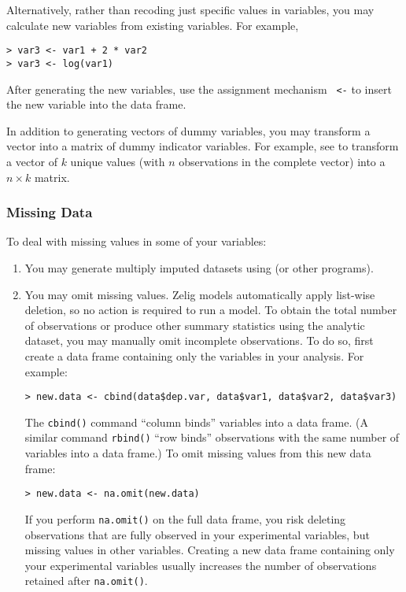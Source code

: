 \documentclass{article}
\begin{document}
Alternatively, rather than recoding just specific values in variables,
you may calculate new variables from existing variables.  For example,
\begin{verbatim}
> var3 <- var1 + 2 * var2   
> var3 <- log(var1)         
\end{verbatim}
After generating the new variables, use the assignment mechanism {\tt
  <-} to insert the new variable into the data frame.

In addition to generating vectors of dummy variables, you may
transform a vector into a matrix of dummy indicator variables.  For
example, see  to transform a vector of $k$ unique values
(with $n$ observations in the complete vector) into a $n \times k$
matrix.

\subsubsection*{Missing Data} 

To deal with missing values in some of your variables:
\begin{enumerate}
\item You may generate multiply imputed datasets using
   (or
  other programs).
\item You may omit missing values.  Zelig models automatically apply
  list-wise deletion, so no action is required to run a model.  To
  obtain the total number of observations or produce other summary
  statistics using the analytic dataset, you may manually omit
  incomplete observations.  To do so, first create a data frame
  containing only the variables in your analysis.  For example:
\begin{verbatim}
> new.data <- cbind(data$dep.var, data$var1, data$var2, data$var3)
\end{verbatim}
  The {\tt cbind()} command ``column binds'' variables into a data
  frame.  (A similar command {\tt rbind()} ``row binds'' observations
  with the same number of variables into a data frame.)  To omit
  missing values from this new data frame:
\begin{verbatim}
> new.data <- na.omit(new.data)
\end{verbatim}
  If you perform {\tt na.omit()} on the full data frame, you risk
  deleting observations that are fully observed in your experimental
  variables, but missing values in other variables.  Creating a new
  data frame containing only your experimental variables usually
  increases the number of observations retained after {\tt na.omit()}.
\end{enumerate}

\end{document}
